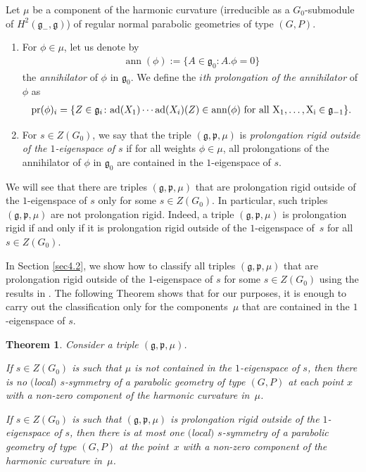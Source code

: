 \documentclass[10pt,a4paper]{amsart}
\newcommand{\fg}{\mathfrak g}
\newcommand{\fp}{\mathfrak p}
\newcommand{\ad}{{\rm ad}}
\numberwithin{equation}{section}
\newtheorem{Theorem}{Theorem}[section]
\begin{document}
\begin{Definition}\label{prolong} \label{prolongation-rigid}
Let $\mu$ be a component of the harmonic curvature (irreducible as a $G_0$-submodule of $H^2(\fg_-,\fg)$) of regular normal parabolic geometries of type $(G,P)$.
\begin{enumerate}\itemsep=0pt
\item For $\phi\in \mu$, let us denote by
\begin{gather*}\operatorname{ann}(\phi):=\{A\in \fg_0\colon A. \phi=0\}\end{gather*}
the \emph{annihilator} of $\phi$ in $\fg_{0}$. We def\/ine the \emph{$i$th prolongation of the annihilator} of $\phi$ as
\begin{gather*}\operatorname{pr}(\phi)_i=\{Z\in \fg_{i}\colon \ad(X_1)\cdots \ad(X_i)(Z)\in \operatorname{ann}(\phi) \ \rm{ for\ all\ } X_1,\dots, X_i\in\fg_{-1}\}.\end{gather*}
\item For $s\in Z(G_0)$, we say that the triple $(\fg,\fp,\mu)$ is \emph{prolongation rigid outside of the $1$-eigen\-space of $s$} if for all weights $\phi\in \mu$, all prolongations of the annihilator of $\phi$ in $\fg_0$ are contained in the $1$-eigenspace of $s$.
\end{enumerate}
\end{Definition}

We will see that there are triples $(\fg,\fp,\mu)$ that are prolongation rigid outside of the $1$-eigenspace of $s$ only for some $s\in Z(G_0)$. In particular, such triples $(\fg,\fp,\mu)$ are not prolongation rigid. Indeed, a triple $(\fg,\fp,\mu)$ is prolongation rigid if and only if it is prolongation rigid outside of the $1$-eigenspace of~$s$ for all $s\in Z(G_0)$.

In Section \ref{sec4.2}, we show how to classify all triples $(\fg,\fp,\mu)$ that are prolongation rigid outside of the $1$-eigenspace of $s$ for some $s\in Z(G_0)$ using the results in \cite{KT}. The following Theorem shows that for our purposes, it is enough to carry out the classif\/ication only for the compo\-nents~$\mu$ that are contained in the $1$-eigenspace of $s$.

\begin{Theorem}\label{t1.2}
Consider a triple $(\fg,\fp,\mu)$.

If $s\in Z(G_0)$ is such that $\mu$ is not contained in the $1$-eigenspace of $s$, then there is no $($local$)$ $s$-symmetry of a parabolic geometry of type $(G,P)$ at each point $x$ with a non-zero component of the harmonic curvature in~$\mu$.

If $s\in Z(G_0)$ is such that $(\fg,\fp,\mu)$ is prolongation rigid outside of the $1$-eigenspace of $s$, then there is at most one $($local$)$ $s$-symmetry of a parabolic geometry of type $(G,P)$ at the point~$x$ with a non-zero component of the harmonic curvature in~$\mu$.
\end{Theorem}
\end{document}
